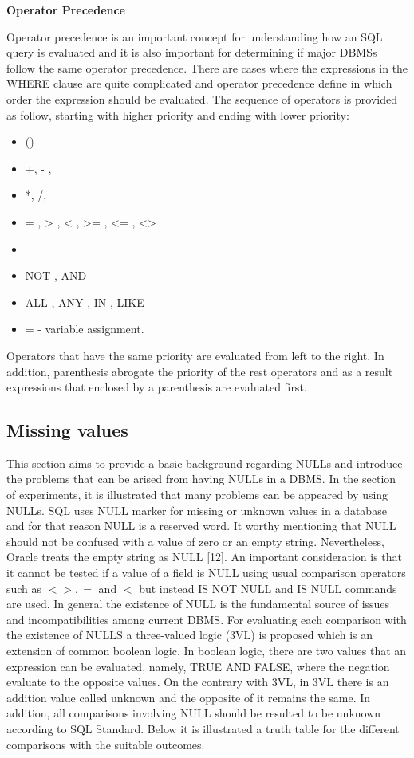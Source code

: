 \textbf{Operator Precedence}

Operator precedence is an important concept for understanding how an SQL query is evaluated and it is also important for determining if major DBMSs follow the same operator precedence. There are cases where the expressions in the WHERE clause are quite complicated and operator precedence define in which order the expression should be evaluated. The sequence of operators is provided as follow, starting with higher priority and ending with lower priority: 

\begin{itemize}
\item  () 
\item  +, - , ~
\item  *, /, %
\item  = , > , < , >= , <= , <>
\item   
\item  NOT ,  AND
\item  ALL , ANY , IN , LIKE
\item  = - variable assignment. 
\end{itemize}

Operators that have the same priority are evaluated from left to the right. In addition, parenthesis abrogate the priority of the rest operators and as a result expressions that enclosed by a parenthesis are evaluated first.    
 
 
\subsection{Missing values} 

This section aims to provide a basic background regarding NULLs and introduce the problems that can be arised from having NULLs in a DBMS. In the section of experiments, it is illustrated that many problems can be appeared by using NULLs. SQL uses NULL marker for missing or unknown values in a database and for that reason NULL is a reserved word. It worthy mentioning that NULL should not be confused with a value of zero or an empty string. Nevertheless, Oracle treats the empty string as NULL [12].  An important consideration is that it cannot be tested if a value of a field is NULL using usual comparison operators such as $ <>, = $ and $<$ but instead IS NOT NULL and IS NULL commands are used. In general the existence of NULL is the fundamental source of issues and incompatibilities among current DBMS. For evaluating each comparison with the existence of NULLS a three-valued logic (3VL) is proposed which is an extension of common boolean logic. In boolean logic, there are two values that an expression can be evaluated, namely, TRUE AND FALSE, where the negation evaluate to the opposite values. On the contrary with 3VL, in 3VL there is an addition value called unknown and the opposite of it remains the same. In addition, all comparisons involving NULL should be resulted to be unknown according to SQL Standard. Below it is illustrated a truth table for the different comparisons with the suitable outcomes.    


